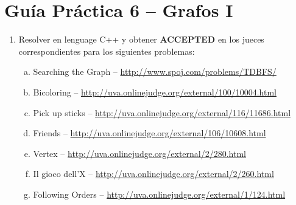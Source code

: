 




\section*{Gu\'ia Pr\'actica 6 -- Grafos I}

\begin{enumerate}[1 -]
	
	\item Resolver en lenguage C++ y obtener \textbf{ACCEPTED} en los jueces correspondientes para los siguientes problemas:
	
	\begin{enumerate}[a)]	
		\item  Searching the Graph -- \href{http://www.spoj.com/problems/TDBFS/}{http://www.spoj.com/problems/TDBFS/}
		\item  Bicoloring -- \href{http://uva.onlinejudge.org/external/100/10004.html}{http://uva.onlinejudge.org/external/100/10004.html}
		\item  Pick up sticks -- \href{http://uva.onlinejudge.org/external/116/11686.html}{http://uva.onlinejudge.org/external/116/11686.html}
		\item Friends -- \href{http://uva.onlinejudge.org/external/106/10608.html}{http://uva.onlinejudge.org/external/106/10608.html}


		\item Vertex -- \href{http://uva.onlinejudge.org/external/2/280.html}{http://uva.onlinejudge.org/external/2/280.html}


		\item Il gioco dell’X -- \href{http://uva.onlinejudge.org/external/2/260.html}{http://uva.onlinejudge.org/external/2/260.html}		
		\item  Following Orders -- \href{http://uva.onlinejudge.org/external/1/124.html}{http://uva.onlinejudge.org/external/1/124.html}
		

	\end{enumerate}
\end{enumerate}

